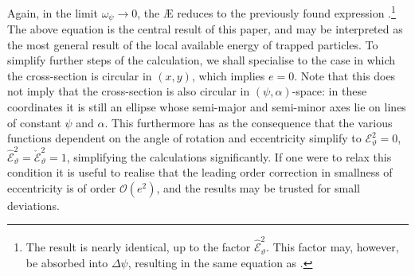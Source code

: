 Again, in the limit $\omega_\psi  \rightarrow 0$, the \AE{} reduces to the previously found expression \citep{Helander2020AvailablePlasmas}.\footnote{The result is nearly identical, up to the factor $\hat{\mathcal{E}}_\vartheta^2$. This factor may, however, be absorbed into $\Delta \psi$, resulting in the same equation as \citet{Helander2020AvailablePlasmas}.} The above equation is the central result of this paper, and may be interpreted as the most general result of the local available energy of trapped particles. To simplify further steps of the calculation, we shall specialise to the case in which the cross-section is circular in $(x,y)$, which implies $e = 0$. Note that this does not imply that the cross-section is also circular in $(\psi,\alpha)$-space: in these coordinates it is still an ellipse whose semi-major and semi-minor axes lie on lines of constant $\psi$ and $\alpha$. This furthermore has as the consequence that the various functions dependent on the angle of rotation and eccentricity simplify to $\mathcal{E}_\vartheta^2 = 0$,  $\hat{\mathcal{E}}_{\vartheta}^2=\check{\mathcal{E}}_{\vartheta}^2 = 1$, simplifying the calculations significantly. If one were to relax this condition it is useful to realise that the leading order correction in smallness of eccentricity is of order $\mathcal{O}(e^2)$, and the results may be trusted for small deviations.


